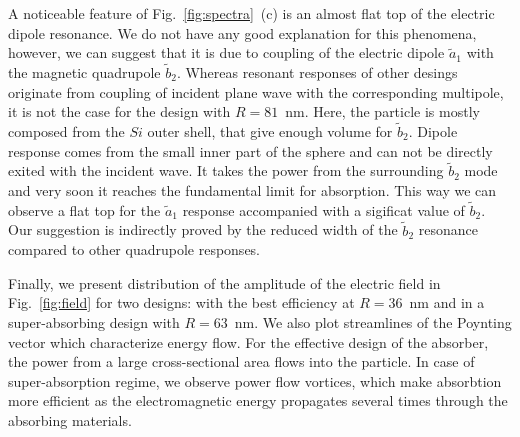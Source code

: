 \documentclass[aps,prl,twocolumn,showpacs,superscriptaddress,groupedaddress]{revtex4-1}
\begin{document}
A noticeable feature of Fig.~\ref{fig:spectra}~(c) is an almost flat top
of the electric dipole resonance.  We do not have any good explanation
for this phenomena, however, we can suggest that it is due to coupling
of the electric dipole $\tilde{a}_1$ with the magnetic quadrupole
$\tilde{b}_2$.  Whereas resonant responses of other desings originate
from coupling of incident plane wave with the corresponding multipole,
it is not the case for the design with $R=81$~nm. Here, the particle is
mostly composed from the $Si$ outer shell, that give enough volume for
$\tilde{b}_2$.  Dipole response comes from the small inner part of the
sphere and can not be directly exited with the incident wave.  It
takes the power from the surrounding $\tilde{b}_2$ mode and very soon
it reaches the fundamental limit for absorption.  This way we can
observe a flat top for the $\tilde{a}_1$ response accompanied with a
sigificat value of $\tilde{b}_2$.  Our suggestion is indirectly proved
by the reduced width of the $\tilde{b}_2$ resonance compared to other
quadrupole responses.

\begin{figure}
\end{figure}
Finally, we present distribution of the amplitude of the electric
field in Fig.~\ref{fig:field} for two designs: with the best
efficiency at $R=36$~nm and in a super-absorbing design with
$R=63$~nm.  We also plot streamlines of the Poynting vector which characterize
energy flow. For the effective design of the absorber, the power from
a large cross-sectional area flows into the particle.  In case of
super-absorption regime, we observe power flow vortices, which make
absorbtion more efficient as the electromagnetic energy propagates
several times through the absorbing materials.
\end{document}
